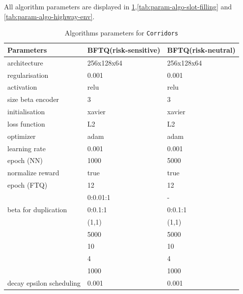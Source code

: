 All algorithm parameters are displayed in \cref{tab:param-algo-corridors},\cref{tab:param-algo-slot-filling} and \cref{tab:param-algo-highway-env}.

\begin{table}[tp]
    \centering
    \begin{tabularx}{1.0\textwidth}{lll}
        \toprule
        Parameters & BFTQ(risk-sensitive) & BFTQ(risk-neutral)\tabularnewline
        \midrule
        architecture & 256x128x64 & 256x128x64\tabularnewline
        regularisation & 0.001 & 0.001\tabularnewline
        activation & relu & relu\tabularnewline
        size beta encoder & 3 & 3\tabularnewline
        initialisation & xavier & xavier\tabularnewline
        loss function & L2 & L2\tabularnewline
        optimizer & adam & adam\tabularnewline
        learning rate & 0.001 & 0.001\tabularnewline
        epoch (NN) & 1000 & 5000\tabularnewline
        normalize reward & true & true\tabularnewline
        epoch (FTQ) & 12 & 12\tabularnewline
        & 0:0.01:1 & -\tabularnewline
        beta for duplication & 0:0.1:1 & 0:0.1:1\tabularnewline
        & (1,1) & (1,1)\tabularnewline
        & 5000 & 5000\tabularnewline
        & 10 & 10\tabularnewline
        & 4 & 4\tabularnewline
        & 1000 & 1000\tabularnewline
        decay epsilon scheduling & 0.001 & 0.001\tabularnewline
        \bottomrule

    \end{tabularx}
    \caption{Algorithms parameters for \texttt{Corridors}}
    \label{tab:param-algo-corridors}
\end{table}


